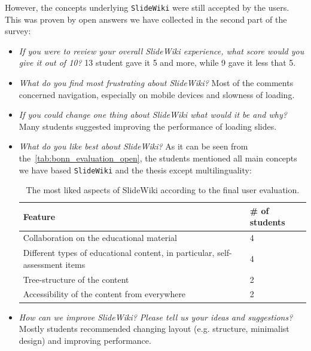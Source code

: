 \documentclass[PhD, Submit, ngerman,UKenglish,table]{scrbook}
\begin{document}
However, the concepts underlying \texttt{SlideWiki} were still accepted by the users.
This was proven by open answers we have collected in the second part of the survey:
\begin{itemize}
\item \emph{If you were to review your overall SlideWiki experience, what score would you give it out of 10?} 13 student gave it 5 and more, while 9 gave it less that 5.

\item \emph{What do you find most frustrating about SlideWiki?} Most of the comments concerned navigation, especially on mobile devices and slowness of loading.

\item \emph{If you could change one thing about SlideWiki what would it be and why?} Many students suggested improving the performance of loading slides.

\item \emph{What do you like best about SlideWiki?} As it can be seen from the~\autoref{tab:bonn_evaluation_open}, the students mentioned all main concepts we have based \texttt{SlideWiki} and the thesis except multilinguality:

\begin{table}[!h]
\centering

\begin{tabularx}{\columnwidth}{ll}    
    \toprule
    
    \textbf{Feature} & \textbf{\# of students} \\
    \midrule
    Collaboration on the educational material & 4 \\
    Different types of educational content, in particular, self-assessment items & 4\\
    Tree-structure of the content & 2 \\
    Accessibility of the content from everywhere & 2 \\
	\bottomrule
    \end{tabularx}
\caption{The most liked aspects of SlideWiki according to the final user evaluation.}
\label{tab:bonn_evaluation_open}
\end{table}

\item \emph{How can we improve SlideWiki? Please tell us your ideas and suggestions?} Mostly students recommended changing layout (e.g. structure, minimalist design) and improving performance.
\end{itemize}
\end{document}

